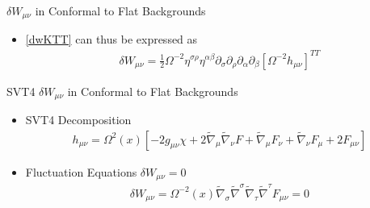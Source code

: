 \documentclass[8pt,aspectratio=1610]{beamer}
\begin{document}
\begin{frame}{$\delta W_{\mu\nu}$ in Conformal to Flat Backgrounds}
{\begin{itemize}
\begin{eqnarray}
			-\int d^4x' D^{(4)}(x-x')\partial_{\nu}\partial^{\alpha}K_{\alpha\mu}
			\\
			&+&\frac{2}{3}\partial_{\mu}\partial_{\nu}\int d^4x' D^{(4)}(x-x')\int d^4x'' D^{(4)}(x'-x'')\partial^{\alpha}\partial^{\beta}K_{\alpha\beta}+\frac{1}{3}g_{\mu\nu}\int d^4x D^{(4)}(x-x')\partial^{\alpha}\partial^{\beta}K_{\alpha\beta}
			\nonumber
			\end{eqnarray}
			\item \eqref{dwKTT} can thus be expressed as
			\begin{eqnarray}
			\boxed{
				\delta W_{\mu\nu}=\frac{1}{2}\Omega^{-2}\eta^{\sigma\rho}\eta^{\alpha\beta}\partial_{\sigma}\partial_{\rho} \partial_{\alpha}\partial_{\beta}[\Omega^{-2}h_{\mu\nu}]^{TT}
				\label{F3}}
			\end{eqnarray}
		\end{itemize}
	}
\end{frame}


\begin{frame}{SVT4 $\delta W_{\mu\nu}$ in Conformal to Flat Backgrounds}
	\begin{itemize}
		\item SVT4 Decomposition
		\begin{eqnarray}
		h_{\mu\nu}=\Omega^2(x)\left[-2 g_{\mu\nu}\chi+2\tilde\nabla_{\mu}\tilde\nabla_{\nu}F
		+ \tilde\nabla_{\mu}F_{\nu}+\tilde\nabla_{\nu}F_{\mu}+2F_{\mu\nu}\right]
		\end{eqnarray}
		\vspace{3mm}
		\item Fluctuation Equations $\delta W_{\mu\nu} = 0$
		\begin{eqnarray}
		\boxed{\delta W_{\mu\nu}=\Omega^{-2}(x)\tilde\nabla_{\sigma}\tilde\nabla^{\sigma}\tilde\nabla_{\tau}\tilde\nabla^{\tau}F_{\mu\nu}=0}
		\end{eqnarray} 
	\end{itemize}
\end{frame}

\end{document}
